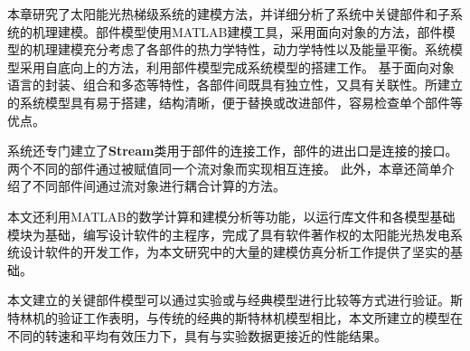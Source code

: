 本章研究了太阳能光热梯级系统的建模方法，并详细分析了系统中关键部件和子系统的机理建模。部件模型使用MATLAB建模工具，采用面向对象的方法，部件模型的机理建模充分考虑了各部件的热力学特性，动力学特性以及能量平衡。系统模型采用自底向上的方法，利用部件模型完成系统模型的搭建工作。
基于面向对象语言的封装、组合和多态等特性，各部件间既具有独立性，又具有关联性。所建立的系统模型具有易于搭建，结构清晰，便于替换或改进部件，容易检查单个部件等优点。

系统还专门建立了\textbf{Stream}类用于部件的连接工作，部件的进出口是连接的接口。两个不同的部件通过被赋值同一个流对象而实现相互连接。
此外，本章还简单介绍了不同部件间通过流对象进行耦合计算的方法。

本文还利用MATLAB的数学计算和建模分析等功能，以运行库文件和各模型基础模块为基础，编写设计软件的主程序，完成了具有软件著作权的太阳能光热发电系统设计软件的开发工作，为本文研究中的大量的建模仿真分析工作提供了坚实的基础。

本文建立的关键部件模型可以通过实验或与经典模型进行比较等方式进行验证。斯特林机的验证工作表明，与传统的经典的斯特林机模型相比，本文所建立的模型在不同的转速和平均有效压力下，具有与实验数据更接近的性能结果。